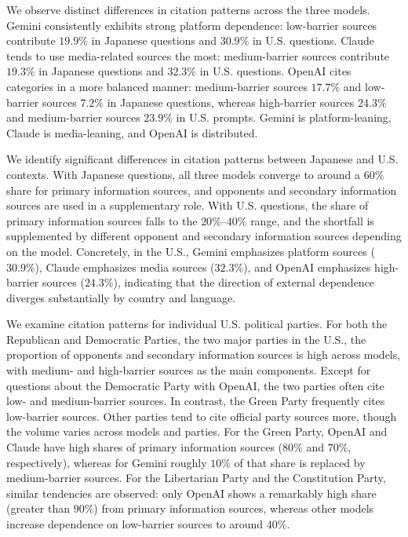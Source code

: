 We observe distinct differences in citation patterns across the three models.
Gemini consistently exhibits strong platform dependence: low-barrier sources contribute \(19.9\%\) in Japanese questions and \(30.9\%\) in U.S. questions.
Claude tends to use media-related sources the most: medium-barrier sources contribute \(19.3\%\) in Japanese questions and \(32.3\%\) in U.S. questions.
OpenAI cites categories in a more balanced manner: medium-barrier sources \(17.7\%\) and low-barrier sources \(7.2\%\) in Japanese questions, whereas high-barrier sources \(24.3\%\) and medium-barrier sources \(23.9\%\) in U.S. prompts.
Gemini is platform-leaning, Claude is media-leaning, and OpenAI is distributed.

We identify significant differences in citation patterns between Japanese and U.S. contexts.
With Japanese questions, all three models converge to around a \(60\%\) share for primary information sources, and opponents and secondary information sources are used in a supplementary role.
With U.S. questions, the share of primary information sources falls to the \(20\%\)--\(40\%\) range, and the shortfall is supplemented by different opponent and secondary information sources depending on the model.
Concretely, in the U.S., Gemini emphasizes platform sources (\(30.9\%\)), Claude emphasizes media sources (\(32.3\%\)), and OpenAI emphasizes high-barrier sources (\(24.3\%\)), indicating that the direction of external dependence diverges substantially by country and language.

We examine citation patterns for individual U.S. political parties.
For both the Republican and Democratic Parties, the two major parties in the U.S., the proportion of opponents and secondary information sources is high across models, with medium- and high-barrier sources as the main components.
Except for questions about the Democratic Party with OpenAI, the two parties often cite low- and medium-barrier sources.
In contrast, the Green Party frequently cites low-barrier sources.
Other parties tend to cite official party sources more, though the volume varies across models and parties.
For the Green Party, OpenAI and Claude have high shares of primary information sources (\(80\%\) and \(70\%\), respectively), whereas for Gemini roughly \(10\%\) of that share is replaced by medium-barrier sources.
For the Libertarian Party and the Constitution Party, similar tendencies are observed: only OpenAI shows a remarkably high share (greater than \(90\%\)) from primary information sources, whereas other models increase dependence on low-barrier sources to around \(40\%\).

